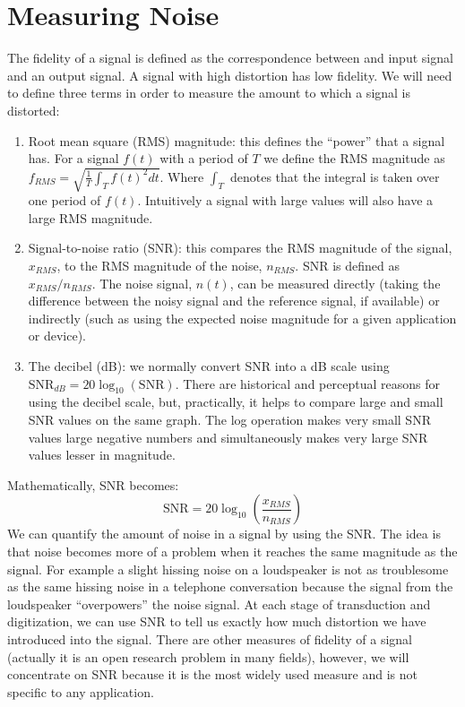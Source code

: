 \section{Measuring Noise}
The fidelity of a signal is defined as the correspondence between and input signal and an output signal. A signal with high distortion has low fidelity. We will need to define three terms in order to measure the amount to which a signal is distorted: 
\begin{enumerate}
\item Root mean square (RMS) magnitude: this defines the ``power'' that a signal has. For a signal $f(t)$ with a period of $T$ we define the RMS magnitude as $f_{RMS}=\sqrt{\frac{1}{T}\int_{T}f(t)^2 dt}$. Where $\int_T$ denotes that the integral is taken over one period of $f(t)$. Intuitively a signal with large values will also have a large RMS magnitude.  
\item  Signal-to-noise ratio (SNR): this compares the RMS magnitude of the signal, $x_{RMS}$, to the RMS magnitude of the noise, $n_{RMS}$. SNR is defined as $x_{RMS}/n_{RMS}$. The noise signal, $n(t)$, can be measured directly (taking the difference between the noisy signal and the reference signal, if available) or indirectly (such as using the expected noise magnitude for a given application or device). 
\item The decibel (dB): we normally convert SNR into a dB scale using $\text{SNR}_{dB}=20\log_{10}(\text{SNR})$. There are historical and perceptual reasons for using the decibel scale, but, practically, it helps to compare large and small SNR values on the same graph. The log operation makes very small SNR values large negative numbers and simultaneously makes very large SNR values lesser in magnitude.
\end{enumerate}
Mathematically, SNR becomes:
\[
\text{SNR}=20\log_{10}\left(\frac{x_{RMS}}{n_{RMS}}\right) \label{eq:SNR}
\]
We can quantify the amount of noise in a signal by using the SNR. The idea is that noise becomes more of a problem when it reaches the same magnitude as the signal. For example a slight hissing noise on a loudspeaker is not as troublesome as the same hissing noise in a telephone conversation because the signal from the loudspeaker ``overpowers'' the noise signal. At each stage of transduction and digitization, we can use SNR to tell us exactly how much distortion we have introduced into the signal. There are other measures of fidelity of a signal (actually it is an open research problem in many fields), however, we will concentrate on SNR because it is the most widely used measure and is not specific to any application.  

